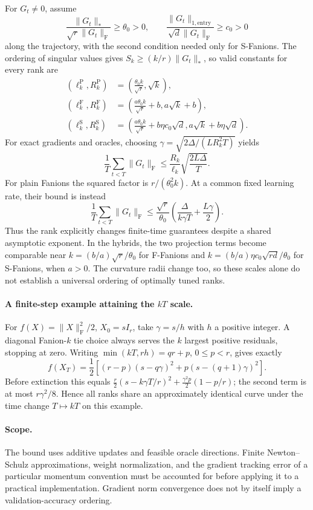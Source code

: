 For $G_t\ne0$, assume
\[
 \frac{\|G_t\|_*}{\sqrt r\|G_t\|_{\mathrm F}}\geq\theta_0>0,
 \qquad
 \frac{\|G_t\|_{1,\mathrm{entry}}}{\sqrt d\|G_t\|_{\mathrm F}}
 \geq c_0>0
\]
along the trajectory, with the second condition needed only for S-Fanions.
The ordering of singular values gives $S_k\geq(k/r)\|G_t\|_*$, so valid
constants for every rank are
\begin{align}
 (\ell_k^{\mathrm P},R_k^{\mathrm P})
   &=\left(\frac{\theta_0 k}{\sqrt r},\sqrt k\right),\\
 (\ell_k^{\mathrm F},R_k^{\mathrm F})
   &=\left(\frac{a\theta_0 k}{\sqrt r}+b,a\sqrt k+b\right),\\
 (\ell_k^{\mathrm S},R_k^{\mathrm S})
   &=\left(\frac{a\theta_0 k}{\sqrt r}+b\eta c_0\sqrt d,
            a\sqrt k+b\eta\sqrt d\right).
\end{align}
For exact gradients and oracles, choosing
$\gamma=\sqrt{2\Delta/(LR_k^2T)}$ yields
\[
 \frac1T\sum_{t<T}\|G_t\|_{\mathrm F}
 \leq\frac{R_k}{\ell_k}\sqrt{\frac{2L\Delta}{T}}.
\]
For plain Fanions the squared factor is $r/(\theta_0^2k)$.
At a common fixed learning rate, their bound is instead
\[
 \frac1T\sum_{t<T}\|G_t\|_{\mathrm F}
 \leq\frac{\sqrt r}{\theta_0}
 \left(\frac{\Delta}{k\gamma T}+\frac{L\gamma}{2}\right).
\]
Thus the rank explicitly changes finite-time guarantees despite a shared
asymptotic exponent. In the hybrids, the two projection terms become
comparable near $k=(b/a)\sqrt r/\theta_0$ for F-Fanions and
$k=(b/a)\eta c_0\sqrt{rd}/\theta_0$ for S-Fanions, when $a>0$.
The curvature radii change too, so these scales alone do not establish a
universal ordering of optimally tuned ranks.

\paragraph{A finite-step example attaining the $kT$ scale.}
For $f(X)=\|X\|_{\mathrm F}^2/2$, $X_0=sI_r$, take
$\gamma=s/h$ with $h$ a positive integer. A diagonal Fanion-$k$ tie choice
always serves the $k$ largest positive residuals, stopping at zero.
Writing $\min(kT,rh)=qr+p$, $0\leq p<r$, gives exactly
\[
 f(X_T)=\frac12\left[(r-p)(s-q\gamma)^2
                         +p(s-(q+1)\gamma)^2\right].
\]
Before extinction this equals
$\frac r2(s-k\gamma T/r)^2+\frac{\gamma^2p}{2}(1-p/r)$;
the second term is at most $r\gamma^2/8$.
Hence all ranks share an approximately identical curve under the time
change $T\mapsto kT$ on this example.

\paragraph{Scope.}
The bound uses additive updates and feasible oracle directions. Finite
Newton--Schulz approximations, weight normalization, and the gradient
tracking error of a particular momentum convention must be accounted for
before applying it to a practical implementation. Gradient norm convergence
does not by itself imply a validation-accuracy ordering.

